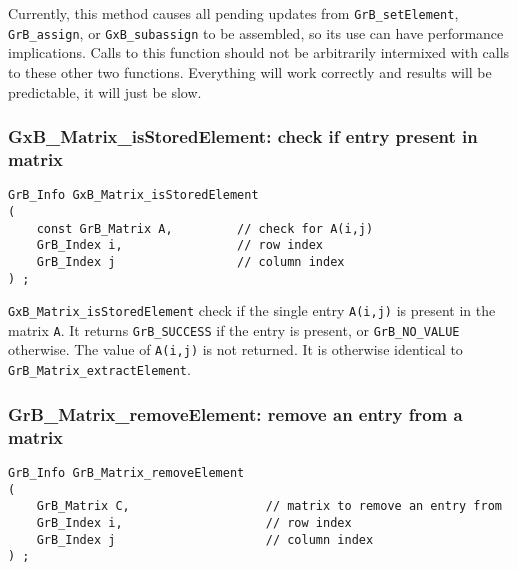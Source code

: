 \documentclass[12pt]{article}
\begin{document}
Currently, this method causes all pending updates from
\verb'GrB_setElement', \verb'GrB_assign', or \verb'GxB_subassign' to be
assembled, so its use can have performance implications.  Calls to this
function should not be arbitrarily intermixed with calls to these other two
functions.  Everything will work correctly and results will be predictable, it
will just be slow.

\newpage
\subsubsection{{\sf GxB\_Matrix\_isStoredElement:} check if entry present in matrix}
\label{matrix_isStoredElement}

\begin{mdframed}[userdefinedwidth=6in]
{\footnotesize
\begin{verbatim}
GrB_Info GxB_Matrix_isStoredElement
(
    const GrB_Matrix A,         // check for A(i,j)
    GrB_Index i,                // row index
    GrB_Index j                 // column index
) ;
\end{verbatim} } \end{mdframed}

\verb'GxB_Matrix_isStoredElement' check if the single entry \verb'A(i,j)' is
present in the matrix \verb'A'.  It returns \verb'GrB_SUCCESS' if the entry is
present, or \verb'GrB_NO_VALUE' otherwise.  The value of \verb'A(i,j)' is not
returned. It is otherwise identical to \verb'GrB_Matrix_extractElement'.

\subsubsection{{\sf GrB\_Matrix\_removeElement:} remove an entry from a matrix}
\label{matrix_removeElement}

\begin{mdframed}[userdefinedwidth=6in]
{\footnotesize
\begin{verbatim}
GrB_Info GrB_Matrix_removeElement
(
    GrB_Matrix C,                   // matrix to remove an entry from
    GrB_Index i,                    // row index
    GrB_Index j                     // column index
) ;
\end{verbatim} } \end{mdframed}
\end{document}
